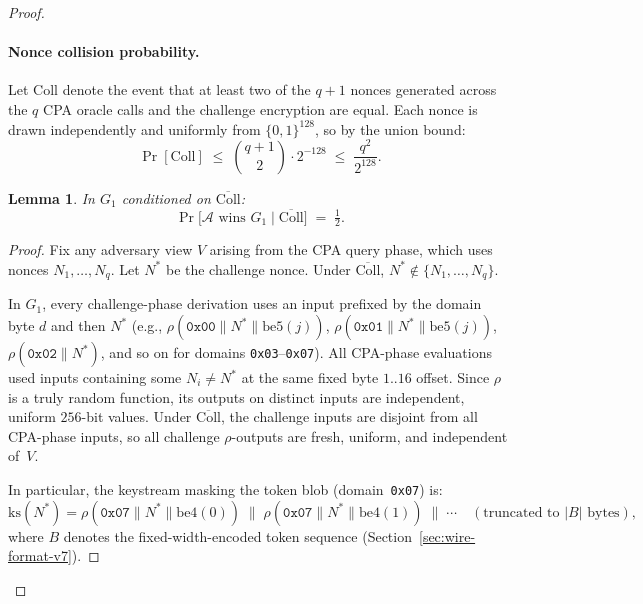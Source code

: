 \documentclass[11pt,a4paper]{article}
\newtheorem{lemma}[theorem]{Lemma}
\begin{document}
\begin{proof}
\paragraph{Nonce collision probability.}
Let $\mathrm{Coll}$ denote the event that at least two of the $q+1$ nonces
generated across the $q$ CPA oracle calls and the challenge encryption are
equal.  Each nonce is drawn independently and uniformly from $\{0,1\}^{128}$,
so by the union bound:
\[
  \Pr[\mathrm{Coll}]
  \;\leq\;
  \binom{q+1}{2}\cdot 2^{-128}
  \;\leq\;
  \frac{q^2}{2^{128}}.
\]

\begin{lemma}\label{lem:hiding}
In $G_1$ conditioned on $\overline{\mathrm{Coll}}$:
\[
  \Pr\bigl[\mathcal{A}\text{ wins }G_1\;\big|\;\overline{\mathrm{Coll}}\bigr]
  \;=\;\tfrac{1}{2}.
\]
\end{lemma}

\begin{proof}
Fix any adversary view $V$ arising from the CPA query phase, which uses
nonces $N_1,\ldots,N_q$.  Let $N^*$ be the challenge nonce.
Under $\overline{\mathrm{Coll}}$, $N^*\notin\{N_1,\ldots,N_q\}$.

In $G_1$, every challenge-phase derivation uses an input prefixed by the
domain byte $d$ and then $N^*$
(e.g., $\rho(\texttt{0x00}\|N^*\|\mathrm{be5}(j))$,
$\rho(\texttt{0x01}\|N^*\|\mathrm{be5}(j))$, $\rho(\texttt{0x02}\|N^*)$,
and so on for domains \texttt{0x03}--\texttt{0x07}).
All CPA-phase evaluations used inputs containing some $N_i\neq N^*$ at the
same fixed byte $1..16$ offset.
Since $\rho$ is a truly random function, its outputs on distinct inputs are
independent, uniform $256$-bit values.
Under $\overline{\mathrm{Coll}}$, the challenge inputs are disjoint from
all CPA-phase inputs, so all challenge $\rho$-outputs are fresh, uniform,
and independent of~$V$.

In particular, the keystream masking the token blob (domain~\texttt{0x07}) is:
\[
  \mathrm{ks}(N^*)
  = \rho(\texttt{0x07}\|N^*\|\mathrm{be4}(0))
    \;\|\;
    \rho(\texttt{0x07}\|N^*\|\mathrm{be4}(1))
    \;\|\;\cdots
  \quad(\text{truncated to }|B|\text{ bytes}),
\]
where $B$ denotes the fixed-width-encoded token sequence (Section~\ref{sec:wire-format-v7}).


\end{proof}
\end{proof}
\end{document}
